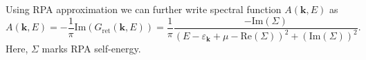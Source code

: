 \documentclass[preprint,prb,amsmath,superscriptaddress,showpacs]{revtex4}
\begin{document}
%
Using RPA approximation we can further write spectral function
$A(\mathbf{k}, E)$ as
%
\begin{equation}
A(\mathbf{k}, E) = - \frac{1}{\pi} \mathrm{Im} (G_{\mathrm{ret}}(\mathbf{k}, E)) =
\frac{1}{\pi} \frac{-\mathrm{Im}(\Sigma)}{\left( E -
    \varepsilon_{\mathbf{k}} + \mu - \mathrm{Re}(\Sigma) \right)^2 + (\mathrm{Im}(\Sigma))^2}.
\end{equation}
%
Here, $\Sigma$ marks RPA self-energy.
\end{document}

